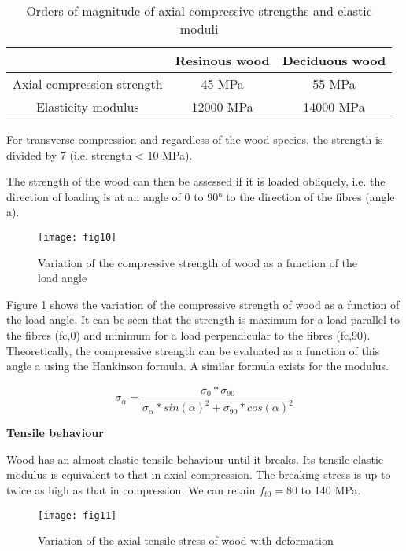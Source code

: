 \begin{table} \centering
	\begin{tabular}{ccc}
		\toprule %
		& Resinous wood & Deciduous wood  \\\midrule
		Axial compression strength & 45 \unit{\mega\pascal}
		& 55 \unit{\mega\pascal} \\\midrule
		Elasticity modulus & 12000 \unit{\mega\pascal}
		& 14000 \unit{\mega\pascal} \\
		\bottomrule %
	\end{tabular}
	\caption{Orders of magnitude of axial compressive strengths and elastic moduli}
	\label{fig:fig9}
\end{table}


For transverse compression and regardless of the wood species, the strength is divided by 7 (i.e. strength < 10 MPa). 

The strength of the wood can then be assessed if it is loaded obliquely, i.e. the direction of loading is at an angle of 0 to 90° to the direction of the fibres (angle a). 


\begin{figure}[htp]
	\centering
	\texttt{[image: fig10]}
	\caption{Variation of the compressive strength of wood as a function of the load angle}
	\label{fig:fig10}
\end{figure}

Figure \ref{fig:fig10} shows the variation of the compressive strength of wood as a function of the load angle. It can be seen that the strength is maximum for a load parallel to the fibres (fc,0) and minimum for a load perpendicular to the fibres (fc,90). Theoretically, the compressive strength can be evaluated as a function of this angle a using the Hankinson formula. A similar formula exists for the modulus.

\begin{equation}
	\sigma_{\alpha} = \frac{\sigma_{0}*\sigma_{90}}{\sigma_{\alpha}*sin(\alpha)^2+\sigma_{90}*cos(\alpha)^2}
\end{equation}

\textbf{Tensile behaviour}

Wood has an almost elastic tensile behaviour until it breaks. Its tensile elastic modulus is equivalent to that in axial compression. The breaking stress is up to twice as high as that in compression. We can retain $f_{t0}=80$ to 140 MPa.


\begin{figure}[htp]
	\centering
	\texttt{[image: fig11]}
	\caption{Variation of the axial tensile stress of wood with deformation}
	\label{fig:galaxy}
\end{figure}

